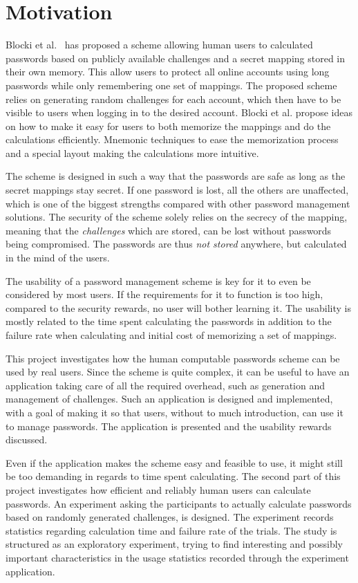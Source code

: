\section{Motivation}
Blocki et al.~\cite{Blocki2014,hcp-blocki} has proposed a scheme allowing human users to calculated passwords based on publicly available challenges and a secret mapping stored in their own memory. This allow users to protect all online accounts using long passwords while only remembering one set of mappings. The proposed scheme relies on generating random challenges for each account, which then have to be visible to users when logging in to the desired account. Blocki et al. propose ideas on how to make it easy for users to both memorize the mappings and do the calculations efficiently. Mnemonic techniques to ease the memorization process and a special layout making the calculations more intuitive.
\par The scheme is designed in such a way that the passwords are safe as long as the secret mappings stay secret. If one password is lost, all the others are unaffected, which is one of the biggest strengths compared with other password management solutions. The security of the scheme solely relies on the secrecy of the mapping, meaning that the \emph{challenges} which are stored, can be lost without passwords being compromised. The passwords are thus \emph{not stored} anywhere, but calculated in the mind of the users. 
\par The usability of a password management scheme is key for it to even be considered by most users. If the requirements for it to function is too high, compared to the security rewards, no user will bother learning it. The usability is mostly related to the time spent calculating the passwords in addition to the failure rate when calculating and initial cost of memorizing a set of mappings.
\par This project investigates how the human computable passwords scheme can be used by real users. Since the scheme is quite complex, it can be useful to have an application taking care of all the required overhead, such as generation and management of challenges. Such an application is designed and implemented, with a goal of making it so that users, without to much introduction, can use it to manage passwords. The application is presented and the usability rewards discussed.
\par Even if the application makes the scheme easy and feasible to use, it might still be too demanding in regards to time spent calculating. The second part of this project investigates how efficient and reliably human users can calculate passwords. An experiment asking the participants to actually calculate passwords based on randomly generated challenges, is designed. The experiment records statistics regarding calculation time and failure rate of the trials. The study is structured as an exploratory experiment, trying to find interesting and possibly important characteristics in the usage statistics recorded through the experiment application.

